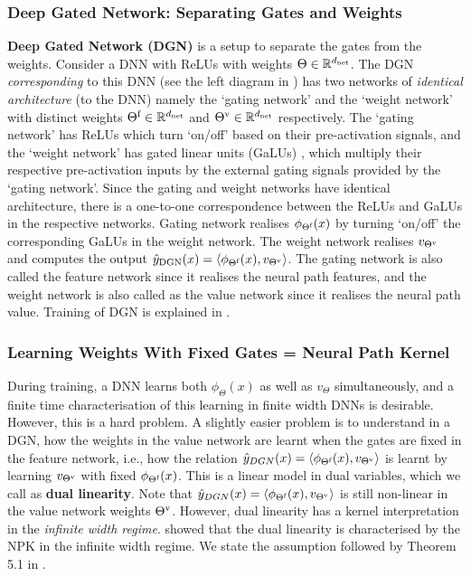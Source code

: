\subsubsection{Deep Gated Network: Separating Gates and Weights}
\textbf{Deep Gated Network (DGN)} is a setup to separate the gates from the weights. Consider a DNN with ReLUs with weights $\Theta\in\mathbb{R}^{d_{\text{net}}}$. The DGN \emph{corresponding} to this DNN (see the left diagram in ) has two networks of \emph{identical architecture} (to the DNN) namely the `gating network' and the `weight network' with distinct weights $\Theta^{\textrm{f}}\in\mathbb{R}^{d_{\text{net}}}$ and ${\Theta}^{\text{v}}\in\mathbb{R}^{d_{\text{net}}}$ respectively.  
The `gating network' has ReLUs which turn `on/off' based on their pre-activation signals, and the `weight network' has gated linear units (GaLUs) \citep{sss,npk}, which multiply their respective pre-activation inputs by the external gating signals provided by the `gating network'.  Since the gating and weight networks have identical architecture, there is a one-to-one correspondence between the ReLUs and GaLUs in the respective networks.  Gating network realises $\phi_{\Theta^{\textrm{f}}}(x)$ by turning `on/off' the corresponding GaLUs in the weight network. The weight network realises $v_{{\Theta}^{\text{v}}}$ and computes the output $\hat{y}_{\text{DGN}}(x)=\langle \phi_{\Theta^{\textrm{f}}}(x),v_{{\Theta}^{\text{v}}}\rangle$.  The gating network is also called the feature network since it realises the neural path features, and the weight network is also called as the value network since it realises the neural path value. Training of DGN is explained in .



\subsubsection{Learning Weights With Fixed Gates = Neural Path Kernel}\label{sec:fixedgates}
During training, a DNN learns both $\phi_{\Theta}(x)$ as well as $v_{\Theta}$ simultaneously, and a finite time characterisation of this learning in finite width DNNs is desirable. However, this is a hard problem. A slightly easier problem is to understand in a DGN, how the weights in the value network are learnt when the gates are fixed in the feature network, i.e., how the relation $\hat{y}_{DGN}(x)=\langle \phi_{\Theta^{\textrm{f}}}(x),v_{{\Theta}^{\text{v}}}\rangle$ is learnt by learning $v_{{\Theta}^{\text{v}}}$ with fixed $\phi_{\Theta^{\textrm{f}}}(x)$. This is a linear model in dual variables, which we call as \textbf{dual linearity}. Note that $\hat{y}_{DGN}(x)=\langle \phi_{\Theta^{\textrm{f}}}(x),v_{{\Theta}^{\text{v}}}\rangle$ is still non-linear in the value network weights ${\Theta}^{\text{v}}$. However, dual linearity has a kernel interpretation in the \emph{infinite width regime}. \cite{npk} showed that the dual linearity is characterised by the NPK in the infinite width regime. We state the assumption followed by Theorem 5.1 in \citep{npk}.

